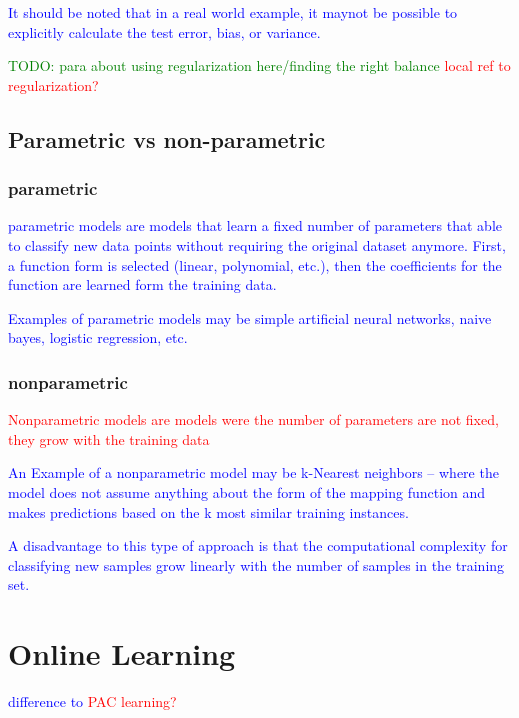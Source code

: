 \textcolor{blue}{It should be noted that in a real world example, it maynot be possible to explicitly calculate the test error, bias, or variance.}

\textcolor{green}{TODO: para about using regularization here/finding the right balance \textcolor{red}{local ref to regularization?}}

\subsection{Parametric vs non-parametric}

\subsubsection{parametric}

\textcolor{blue}{parametric models are models that learn a fixed number of parameters that able to classify new data points without requiring the original dataset anymore. First, a function form is selected (linear, polynomial, etc.), then the coefficients for the function are learned form the training data.}
	
\textcolor{blue}{Examples of parametric models may be simple artificial neural networks, naive bayes, logistic regression, etc.}

\subsubsection{nonparametric}

\textcolor{red}{Nonparametric models are models were the number of parameters are not fixed, they grow with the training data}

\textcolor{blue}{An Example of a nonparametric model may be k-Nearest neighbors -- where the model does not assume anything about the form of the mapping function and makes predictions based on the k most similar training instances.}

\textcolor{blue}{A disadvantage to this type of approach is that the computational complexity for classifying new samples grow linearly with the number of samples in the training set.}

\section{Online Learning}

\textcolor{blue}{difference to \textcolor{red}{PAC learning?}}






